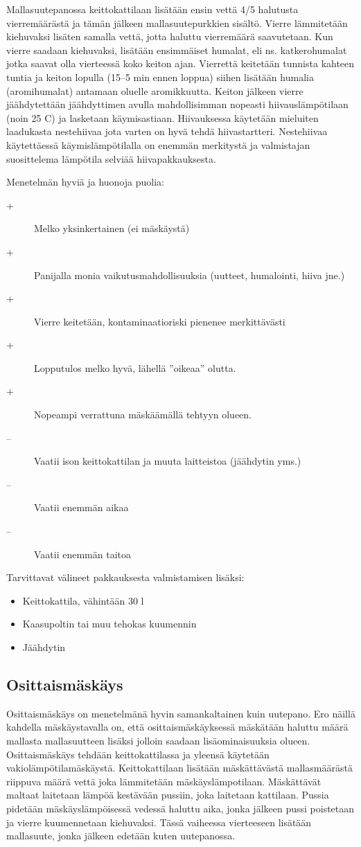 \documentclass[a4paper,11pt]{report}
\begin{document}
Mallasuutepanossa keittokattilaan lisätään ensin vettä 4/5 halutusta vierremäärästä ja tämän jälkeen mallasuutepurkkien sisältö. Vierre lämmitetään kiehuvaksi lisäten samalla vettä, jotta haluttu vierremäärä saavutetaan. Kun vierre saadaan kiehuvaksi, lisätään ensimmäiset humalat, eli ns. katkerohumalat jotka saavat olla vierteessä koko keiton ajan. Vierrettä keitetään tunnista kahteen tuntia ja keiton lopulla (15--5 min ennen loppua) siihen lisätään humalia (aromihumalat) antamaan oluelle aromikkuutta. Keiton jälkeen vierre jäähdytettään jäähdyttimen avulla mahdollisimman nopeasti hiivauslämpötilaan (noin 25 \degree C) ja lasketaan käymisastiaan. Hiivauksessa käytetään mieluiten laadukasta nestehiivaa jota varten on hyvä tehdä hiivastartteri. Nestehiivaa käytettäessä käymislämpötilalla on enemmän merkitystä ja valmistajan suosittelema lämpötila selviää hiivapakkauksesta.

Menetelmän hyviä ja huonoja puolia:
\begin{description}
\item[+] Melko yksinkertainen (ei mäskäystä)
\item[+] Panijalla monia vaikutusmahdollisuuksia (uutteet, humalointi, hiiva jne.) 
\item[+] Vierre keitetään, kontaminaatioriski pienenee merkittävästi 
\item[+] Lopputulos melko hyvä, lähellä ''oikeaa'' olutta.
\item[+] Nopeampi verrattuna mäskäämällä tehtyyn olueen.
\item[--] Vaatii ison keittokattilan ja muuta laitteistoa (jäähdytin yms.)
\item[--] Vaatii enemmän aikaa
\item[--] Vaatii enemmän taitoa
\end{description}
Tarvittavat välineet pakkauksesta valmistamisen lisäksi:
\begin{itemize}
\item Keittokattila, vähintään 30 l
\item Kaasupoltin tai muu tehokas kuumennin
\item Jäähdytin
\end{itemize}

\subsection{Osittaismäskäys}

Osittaismäskäys on menetelmänä hyvin samankaltainen kuin uutepano. Ero näillä kahdella mäskäystavalla on, että osittaismäskäyksessä mäskätään haluttu määrä mallasta mallasuutteen lisäksi jolloin saadaan lisäominaisuuksia olueen. Osittaismäskäys tehdään keittokattilassa ja yleensä käytetään vakiolämpötilamäskäystä. Keittokattilaan lisätään mäskättävästä mallasmäärästä riippuva määrä vettä joka lämmitetään mäskäyslämpotilaan. Mäskättävät maltaat laitetaan lämpöä kestävään pussiin, joka laitetaan kattilaan. Pussia pidetään mäskäyslämpöisessä vedessä haluttu aika, jonka jälkeen pussi poistetaan ja vierre kuumennetaan kiehuvaksi. Tässä vaiheessa vierteeseen lisätään mallasuute, jonka jälkeen edetään kuten uutepanossa.
\end{document}
